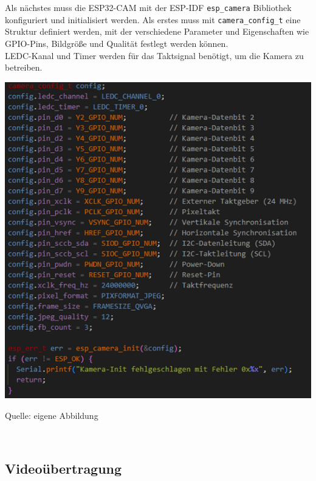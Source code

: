 \documentclass[ngerman,12pt,a4paper]{article}
\begin{document}
	Als nächstes muss die ESP32-CAM mit der ESP-IDF \texttt{esp\_camera} Bibliothek konfiguriert und initialisiert werden. Als erstes muss mit \texttt{camera\_config\_t} eine Struktur definiert werden, mit der verschiedene Parameter und Eigenschaften wie GPIO-Pins, Bildgröße und Qualität festlegt werden können. \\[0.5cm] 
	LEDC-Kanal und Timer werden für das Taktsignal benötigt, um die Kamera zu betreiben.
	\begin{center}
		\begin{minipage}[t]{1\textwidth}
			\includegraphics{Pictures/kamera-setup2}
			\label{fig:Kamera-Initialisierung}
			\vspace{-10pt}
			\begin{center}
				\par\small Quelle: eigene Abbildung 
			\end{center}
		\end{minipage} \\[0.75cm]
	\end{center}
		
			\subsection{Videoübertragung}
			
\end{document}
